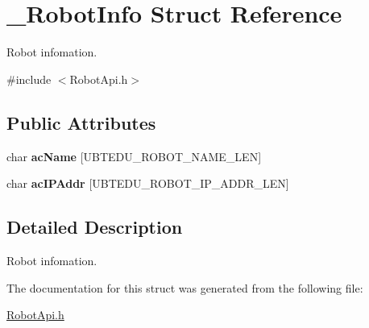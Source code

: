 \hypertarget{struct__RobotInfo}{\section{\+\_\+\+Robot\+Info Struct Reference}
\label{struct__RobotInfo}
}


Robot infomation.  




{\ttfamily \#include $<$Robot\+Api.\+h$>$}

\subsection*{Public Attributes}
\begin{DoxyCompactItemize}
\item 
\hypertarget{struct__RobotInfo_a0dc600adfbf72150e776f100d6ec80ad}{char {\bfseries ac\+Name} \mbox{[}U\+B\+T\+E\+D\+U\+\_\+\+R\+O\+B\+O\+T\+\_\+\+N\+A\+M\+E\+\_\+\+L\+E\+N\mbox{]}}\label{struct__RobotInfo_a0dc600adfbf72150e776f100d6ec80ad}

\item 
\hypertarget{struct__RobotInfo_aca220e4bd42b444cc5f105c4ceaf2760}{char {\bfseries ac\+I\+P\+Addr} \mbox{[}U\+B\+T\+E\+D\+U\+\_\+\+R\+O\+B\+O\+T\+\_\+\+I\+P\+\_\+\+A\+D\+D\+R\+\_\+\+L\+E\+N\mbox{]}}\label{struct__RobotInfo_aca220e4bd42b444cc5f105c4ceaf2760}

\end{DoxyCompactItemize}


\subsection{Detailed Description}
Robot infomation. 

The documentation for this struct was generated from the following file\+:\begin{DoxyCompactItemize}
\item 
\hyperlink{RobotApi_8h}{Robot\+Api.\+h}\end{DoxyCompactItemize}
